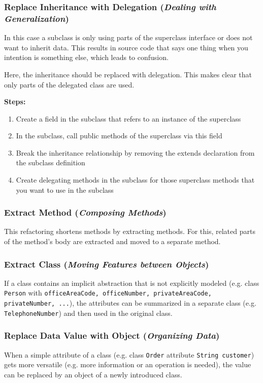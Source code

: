 \subsubsection*{Replace Inheritance with Delegation (\textit{Dealing with Generalization})}
In this case a subclass is only using parts of the superclass interface or does not want to inherit data.
This results in source code that says one thing when you intention is something else, which leads to confusion.

Here, the inheritance should be replaced with delegation.
This makes clear that only parts of the delegated class are used.\newline 

\textbf{Steps:}
\begin{enumerate}
	\item Create a field in the subclass that refers to an instance of the superclass
	\item In the subclass, call public methods of the superclass via this
	field
	\item Break the inheritance relationship by removing the extends declaration from the subclass definition
	\item Create delegating methods in the subclass for those
	superclass methods that you want to use in the subclass
\end{enumerate}

\subsubsection*{Extract Method (\textit{Composing Methods})}
This refactoring shortens methods by extracting methods.
For this, related parts of the method's body are extracted and moved to a separate method.

\subsubsection*{Extract Class (\textit{Moving Features between Objects})}
If a class contains an implicit abstraction that is not explicitly modeled (e.g. class \texttt{Person} with \texttt{officeAreaCode, officeNumber, privateAreaCode, privateNumber, ...}), the attributes can be summarized in a separate class (e.g. \texttt{TelephoneNumber}) and then used in the original class.

\subsubsection*{Replace Data Value with Object (\textit{Organizing Data})}
When a simple attribute of a class (e.g. class \texttt{Order} attribute \texttt{String customer}) gets more versatile (e.g. more information or an operation is needed), the value can be replaced by an object of a newly introduced class.

